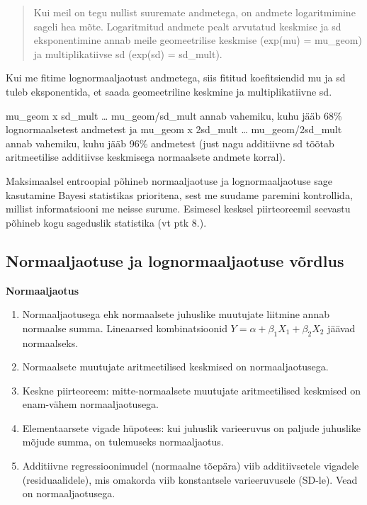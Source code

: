 \documentclass[]{book}
\begin{document}
\begin{quote}
Kui meil on tegu nullist suuremate andmetega, on andmete logaritmimine
sageli hea mõte. Logaritmitud andmete pealt arvutatud keskmise ja sd
eksponentimine annab meile geomeetrilise keskmise (exp(mu) = mu\_geom)
ja multiplikatiivse sd (exp(sd) = sd\_mult).
\end{quote}

Kui me fitime lognormaaljaotust andmetega, siis fititud koefitsiendid mu
ja sd tuleb eksponentida, et saada geomeetriline keskmine ja
multiplikatiivne sd.

mu\_geom x sd\_mult \ldots{} mu\_geom/sd\_mult annab vahemiku, kuhu jääb
68\% lognormaalsetest andmetest ja mu\_geom x 2sd\_mult \ldots{}
mu\_geom/2sd\_mult annab vahemiku, kuhu jääb 96\% andmetest (just nagu
additiivne sd tõõtab aritmeetilise additiivse keskmisega normaalsete
andmete korral).

Maksimaalsel entroopial põhineb normaaljaotuse ja lognormaaljaotuse sage
kasutamine Bayesi statistikas prioritena, sest me suudame paremini
kontrollida, millist informatsiooni me neisse surume. Esimesel kesksel
piirteoreemil seevastu põhineb kogu sageduslik statistika (vt ptk 8.).

\subsection{Normaaljaotuse ja lognormaaljaotuse
võrdlus}\label{normaaljaotuse-ja-lognormaaljaotuse-vordlus}

\textbf{Normaaljaotus}

\begin{enumerate}
\def\labelenumi{\arabic{enumi}.}
\item
  Normaaljaotusega ehk normaalsete juhuslike muutujate liitmine annab
  normaalse summa. Lineaarsed kombinatsioonid
  \(Y= \alpha + \beta_1X_1 + \beta_2X_2\) jäävad normaalseks.
\item
  Normaalsete muutujate aritmeetilised keskmised on normaaljaotusega.
\item
  Keskne piirteoreem: mitte-normaalsete muutujate aritmeetilised
  keskmised on enam-vähem normaaljaotusega.
\item
  Elementaarsete vigade hüpotees: kui juhuslik varieeruvus on paljude
  juhuslike mõjude summa, on tulemuseks normaaljaotus.
\item
  Additiivne regressioonimudel (normaalne tõepära) viib additiivsetele
  vigadele (residuaalidele), mis omakorda viib konstantsele
  varieeruvusele (SD-le). Vead on normaaljaotusega.
\end{enumerate}
\end{document}
